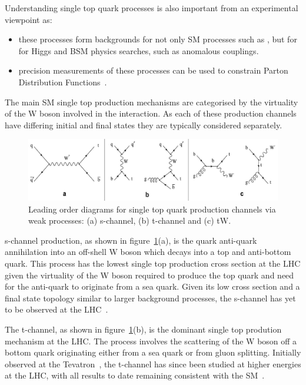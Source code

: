 Understanding single top quark processes is also important from an experimental viewpoint as:
\begin{itemize}
\item these processes form backgrounds for not only SM processes such as \ttbar, but for for Higgs and BSM physics searches, such as anomalous couplings.
\item precision measurements of these processes can be used to constrain Parton Distribution Functions~\cite{Guffanti:2010yu}.
\end{itemize}

The main SM single top production mechanisms are categorised by the virtuality of the W boson involved in the interaction.
As each of these production channels have differing initial and final states they are typically considered separately.

\begin{figure}[!h]
\centering
\includegraphics[width=1.00\textwidth]{figs/top-physics/singletop_feyn.jpg}
\caption{Leading order diagrams for single top quark production channels via weak processes: (a) s-channel, (b) t-channel and (c) tW.}
\label{fig:singleTopDiagrams}
\end{figure}


s-channel production, as shown in figure~\ref{fig:singleTopDiagrams}(a), is the quark anti-quark annihilation into an off-shell W boson which decays into a top and anti-bottom quark.
This process has the lowest single top production cross section at the LHC given the virtuality of the W boson required to produce the top quark and need for the anti-quark to originate from a sea quark.
Given its low cross section and a final state topology similar to larger background processes, the s-channel has yet to be observed at the LHC~\cite{Khachatryan:2016ewo}.

The t-channel, as shown in figure~\ref{fig:singleTopDiagrams}(b), is the dominant single top prodution mechanism at the LHC.
The process involves the scattering of the W boson off a bottom quark originating either from a sea quark or from gluon splitting.
Initially observed at the Tevatron~\cite{Aaltonen:2009jj,Abazov:2009ii}, the t-channel has since been studied at higher energies at the LHC, with all results to date remaining consistent with the SM~\cite{Berta:2017ghf,Morton:2018wkb}.	

